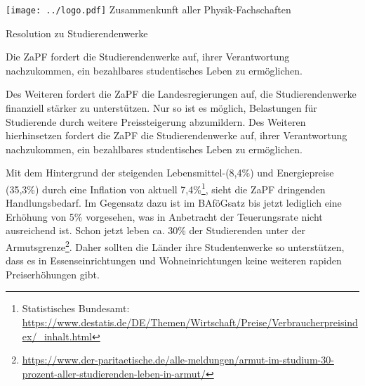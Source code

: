 \documentclass[DIV=calc]{scrartcl}
\begin{document}
\hspace{0.87\textwidth}
\begin{minipage}{120pt}
	\vspace{-1.8cm}
	\texttt{[image: ../logo.pdf]}
	\centering
	\small Zusammenkunft aller Physik-Fachschaften
\end{minipage}

\begin{center}
  \huge{Resolution zu Studierendenwerke}\vspace{.25\baselineskip}\\
  \normalsize
\end{center}
\vspace{1cm}






Die ZaPF fordert die Studierendenwerke auf, ihrer Verantwortung nachzukommen, ein bezahlbares studentisches Leben zu ermöglichen.

Des Weiteren fordert die ZaPF die Landesregierungen auf, die Studierendenwerke finanziell stärker zu unterstützen.
Nur so ist es möglich, Belastungen für Studierende durch weitere Preissteigerung abzumildern.
Des Weiteren hierhinsetzen fordert die ZaPF die Studierendenwerke auf, ihrer Verantwortung nachzukommen, ein bezahlbares studentisches Leben zu ermöglichen.

Mit dem Hintergrund der steigenden Lebensmittel-(8,4\%) und Energiepreise (35,3\%) durch eine Inflation von aktuell 7,4\%\footnote{Statistisches Bundesamt:
\url{https://www.destatis.de/DE/Themen/Wirtschaft/Preise/Verbraucherpreisindex/_inhalt.html}}, sieht die ZaPF dringenden Handlungsbedarf. Im Gegensatz dazu ist im BAföGsatz bis jetzt lediglich eine Erhöhung von 5\% vorgesehen, was in Anbetracht der Teuerungsrate nicht ausreichend ist. Schon jetzt leben ca. 30\% der Studierenden unter der Armutsgrenze\footnote{\url{https://www.der-paritaetische.de/alle-meldungen/armut-im-studium-30-prozent-aller-studierenden-leben-in-armut/}}. Daher sollten die Länder ihre Studentenwerke so unterstützen, dass es in Essenseinrichtungen und Wohneinrichtungen keine weiteren rapiden Preiserhöhungen gibt.
\end{document}
